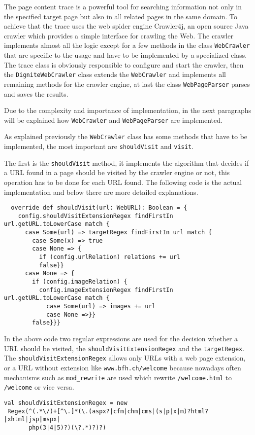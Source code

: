 \documentclass[
	a4paper,					10pt,							twoside,					openright,				notitlepage,			parskip=half,			]{scrreprt}
\begin{document}
The page content trace is a powerful tool for searching information not only in the specified target page 
but also in all related pages in the same domain. To achieve that the trace uses the web spider engine
Crawler4j\cite{page:crawler4j}, an open source Java crawler which provides a simple interface for crawling the Web.
The crawler implements almost all the logic except for a few methods in the class \verb|WebCrawler| that are 
specific to the usage and have to be implemented by a specialized class.
The trace class is obviously responsible to configure and start the crawler, then the \verb|DigniteWebCrawler| 
class extends the \verb|WebCrawler| and implements all remaining methods for the crawler engine, at last the class
\verb|WebPageParser| parses and saves the results. 

Due to the complexity and importance of implementation, in the next paragraphs will be explained 
how \verb|WebCrawler| and \verb|WebPageParser| are implemented.

As explained previously the \verb|WebCrawler| class has some methods that have to be implemented, 
the most important are \verb|shouldVisit| and \verb|visit|.

The first is the \verb|shouldVisit| method, it implements the algorithm that decides if a \gls{URL} found 
in a page should be visited by the crawler engine or not, this operation has to be done for each \gls{URL} found. 
The following code is the actual implementation and below there are more detailed explanations.
\begin{lstlisting}
  override def shouldVisit(url: WebURL): Boolean = {
    config.shouldVisitExtensionRegex findFirstIn url.getURL.toLowerCase match {
      case Some(url) => targetRegex findFirstIn url match {
        case Some(x) => true
        case None => {
          if (config.urlRelation) relations += url
          false}}
      case None => {
        if (config.imageRelation) {
          config.imageExtensionRegex findFirstIn url.getURL.toLowerCase match {
            case Some(url) => images += url
            case None =>}}
        false}}}
\end{lstlisting}

In the above code two regular expressions are used for the decision whether a \gls{URL} should be visited, 
the \verb|shouldVisitExtensionRegex| and the \verb|targetRegex|.
The \verb|shouldVisitExtensionRegex| allows only \gls{URL}s with a web page extension, or a \gls{URL} without 
extension like \verb|www.bfh.ch/welcome| because nowadays often mechanisms such as \verb|mod_rewrite|
are used which rewrite \verb|/welcome.html| to \verb|/welcome| or vice versa.
\begin{lstlisting}[language={}]
val shouldVisitExtensionRegex = new
 Regex(^(.*\/)+[^\.]*(\.(aspx?|cfm|chm|cms|(s|p|x|m)?html?|xhtml|jsp|mspx|
       php(3|4|5)?)(\?.*)?)?)
\end{lstlisting}
\end{document}
